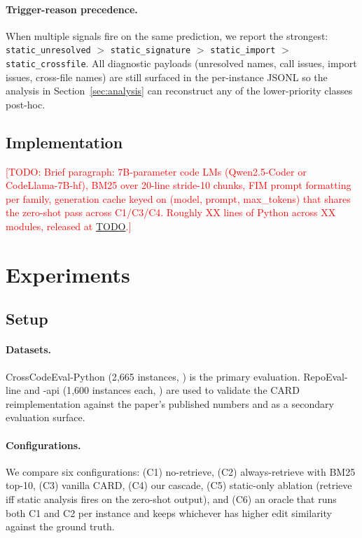 \documentclass[10pt,twocolumn]{article}
\newcommand{\todo}[1]{\textcolor{red}{[TODO: #1]}}
\begin{document}
\paragraph{Trigger-reason precedence.} When multiple signals fire on the
same prediction, we report the strongest:
\texttt{static\_unresolved} $>$ \texttt{static\_signature} $>$
\texttt{static\_import} $>$ \texttt{static\_crossfile}. All diagnostic
payloads (unresolved names, call issues, import issues, cross-file
names) are still surfaced in the per-instance JSONL so the analysis in
Section~\ref{sec:analysis} can reconstruct any of the lower-priority
classes post-hoc.

\subsection{Implementation}

\todo{Brief paragraph: 7B-parameter code LMs (Qwen2.5-Coder or
CodeLlama-7B-hf), BM25 over 20-line stride-10 chunks, FIM prompt
formatting per family, generation cache keyed on (model, prompt, max\_tokens)
that shares the zero-shot pass across C1/C3/C4. Roughly XX lines of Python
across XX modules, released at \url{TODO}.}

\section{Experiments}

\subsection{Setup}

\paragraph{Datasets.} CrossCodeEval-Python (2{,}665 instances,
\cite{ding2023cce}) is the primary evaluation. RepoEval-line and -api
(1{,}600 instances each, \cite{zhang2023repocoder}) are used to validate
the CARD reimplementation against the paper's published numbers and as a
secondary evaluation surface.

\paragraph{Configurations.} We compare six configurations: (C1)
no-retrieve, (C2) always-retrieve with BM25 top-10, (C3) vanilla CARD,
(C4) our cascade, (C5) static-only ablation (retrieve iff static analysis
fires on the zero-shot output), and (C6) an oracle that runs both C1 and
C2 per instance and keeps whichever has higher edit similarity against the
ground truth.
\end{document}
